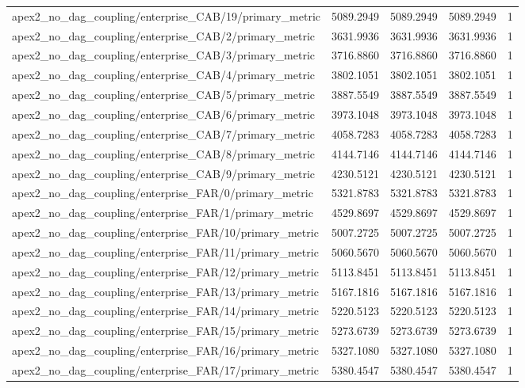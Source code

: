 \begin{table}[h]
\begin{tabular}{lrrrr}
apex2_no_dag_coupling/enterprise_CAB/19/primary_metric & 5089.2949 & 5089.2949 & 5089.2949 & 1 \\
apex2_no_dag_coupling/enterprise_CAB/2/primary_metric & 3631.9936 & 3631.9936 & 3631.9936 & 1 \\
apex2_no_dag_coupling/enterprise_CAB/3/primary_metric & 3716.8860 & 3716.8860 & 3716.8860 & 1 \\
apex2_no_dag_coupling/enterprise_CAB/4/primary_metric & 3802.1051 & 3802.1051 & 3802.1051 & 1 \\
apex2_no_dag_coupling/enterprise_CAB/5/primary_metric & 3887.5549 & 3887.5549 & 3887.5549 & 1 \\
apex2_no_dag_coupling/enterprise_CAB/6/primary_metric & 3973.1048 & 3973.1048 & 3973.1048 & 1 \\
apex2_no_dag_coupling/enterprise_CAB/7/primary_metric & 4058.7283 & 4058.7283 & 4058.7283 & 1 \\
apex2_no_dag_coupling/enterprise_CAB/8/primary_metric & 4144.7146 & 4144.7146 & 4144.7146 & 1 \\
apex2_no_dag_coupling/enterprise_CAB/9/primary_metric & 4230.5121 & 4230.5121 & 4230.5121 & 1 \\
apex2_no_dag_coupling/enterprise_FAR/0/primary_metric & 5321.8783 & 5321.8783 & 5321.8783 & 1 \\
apex2_no_dag_coupling/enterprise_FAR/1/primary_metric & 4529.8697 & 4529.8697 & 4529.8697 & 1 \\
apex2_no_dag_coupling/enterprise_FAR/10/primary_metric & 5007.2725 & 5007.2725 & 5007.2725 & 1 \\
apex2_no_dag_coupling/enterprise_FAR/11/primary_metric & 5060.5670 & 5060.5670 & 5060.5670 & 1 \\
apex2_no_dag_coupling/enterprise_FAR/12/primary_metric & 5113.8451 & 5113.8451 & 5113.8451 & 1 \\
apex2_no_dag_coupling/enterprise_FAR/13/primary_metric & 5167.1816 & 5167.1816 & 5167.1816 & 1 \\
apex2_no_dag_coupling/enterprise_FAR/14/primary_metric & 5220.5123 & 5220.5123 & 5220.5123 & 1 \\
apex2_no_dag_coupling/enterprise_FAR/15/primary_metric & 5273.6739 & 5273.6739 & 5273.6739 & 1 \\
apex2_no_dag_coupling/enterprise_FAR/16/primary_metric & 5327.1080 & 5327.1080 & 5327.1080 & 1 \\
apex2_no_dag_coupling/enterprise_FAR/17/primary_metric & 5380.4547 & 5380.4547 & 5380.4547 & 1 \\

\end{tabular}
\end{table}
